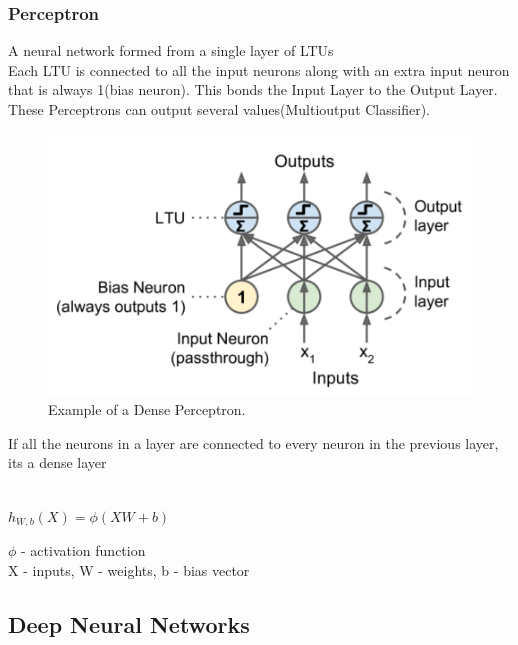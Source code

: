\documentclass[article]{llncs}
\begin{document}
\subsubsection{Perceptron} A neural network formed from a single layer of LTUs\\
Each LTU is connected to all the input neurons along with an extra input neuron that is always 1(bias neuron). This bonds the Input Layer to the Output Layer.\\These Perceptrons can output several values(Multioutput Classifier).
\begin{figure}[H]
\centering
\includegraphics[scale=0.55]{fig2.PNG}
\caption{Example of a Dense Perceptron.} \label{fig2}
\end{figure}
\noindent If all the neurons in a layer are connected to every neuron in the previous layer, its a
dense layer
 \begin{theorem}\\
    $h_{W,b}(X) = \phi(XW + b)$
\end{theorem}
$\phi$ - activation function\\
X - inputs, W - weights, b - bias vector
\subsection{Deep Neural Networks}
\end{document}
